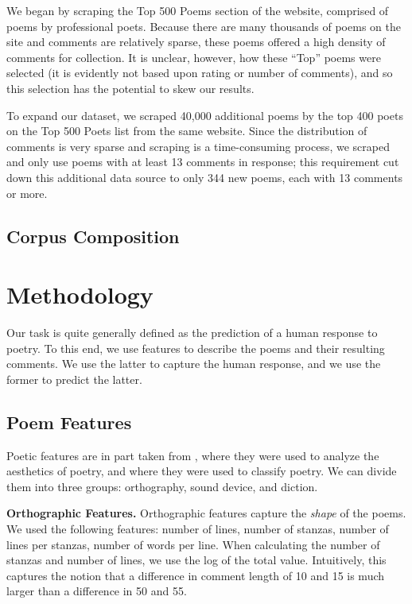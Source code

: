 \documentclass[11pt]{article}
\newcommand{\slimparagraph}[1]{
\vspace{4pt} %
\textbf{#1.}\quad}
\begin{document}
We began by scraping the Top 500 Poems section of the website, comprised of poems by professional poets. Because there are many thousands of poems on the site and comments are relatively sparse, these poems offered a high density of comments for collection. It is unclear, however, how these ``Top'' poems were selected (it is evidently not based upon rating or number of comments), and so this selection has the potential to skew our results. %

To expand our dataset, we scraped 40,000 additional poems by the top 400 poets on the Top 500 Poets list from the same website. Since the distribution of comments is very sparse and scraping is a time-consuming process, we scraped and only use poems with at least 13 comments in response; this requirement cut down this additional data source to only 344 new poems, each with 13 comments or more.

\subsection{Corpus Composition}

\section{Methodology}
Our task is quite generally defined as the prediction of a human response to poetry. To this end, we use features to describe the poems and their resulting comments. We use the latter to capture the human response, and we use the former to predict the latter.

\subsection{Poem Features}
Poetic features are in part taken from , where they were used to analyze the aesthetics of poetry, and  where they were used to classify poetry. We can divide them into three groups: orthography, sound device, and diction.

\slimparagraph{Orthographic Features}
Orthographic features capture the \emph{shape} of the poems. We used the following features: number of lines, number of stanzas, number of lines per stanzas, number of words per line. When calculating the number of stanzas and number of lines, we use the log of the total value. Intuitively, this captures the notion that a difference in comment length of 10 and 15 is much larger than a difference in 50 and 55.
\end{document}

